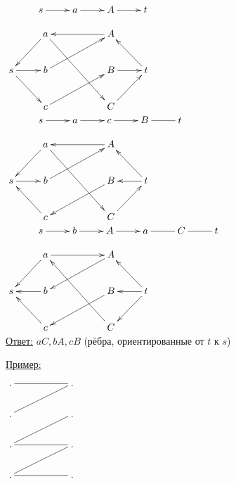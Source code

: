 \documentclass[a4paper, 12pt] {article}
\begin{document}
$\begin{matrix}
	\xymatrix{
		& s  \ar@{->}[r] & a \ar@{->}[r] & A \ar@{->}[r] & t \\
	}
\end{matrix}$

$\xymatrix{
	& 	a \ar@{<-}[rr] \ar@{->}[rrdd]  & & A \\
	s \ar@{->}[r] \ar@{->}[rd] \ar@{<-}[ru] &	b \ar@{->}[rru]    & & B & t \ar@{<-}[l] \ar@{<-}[ld] \ar@{->}[lu] \\
	&	c \ar@{->}[rru]   & & C \\
}$\\

$\begin{matrix}
	\xymatrix{
		& s  \ar@{->}[r] & a \ar@{->}[r] & c \ar@{->}[r] & B \ar@{-}[r] & t \\
	}
\end{matrix}$

$\xymatrix{
	& 	a \ar@{<-}[rr] \ar@{->}[rrdd]  & & A \\
	s \ar@{->}[r] \ar@{<-}[rd] \ar@{<-}[ru] &	b \ar@{->}[rru]    & & B & t \ar@{->}[l] \ar@{<-}[ld] \ar@{->}[lu] \\
	&	c \ar@{<-}[rru]   & & C \\
}$\\

$\begin{matrix}
	\xymatrix{
		& s  \ar@{->}[r] & b \ar@{->}[r] & A \ar@{->}[r] & a \ar@{-}[r] & C \ar@{-}[r] & t \\
	}
\end{matrix}$

$\xymatrix{
	& 	a \ar@{->}[rr] \ar@{<-}[rrdd]  & & A \\
	s \ar@{<-}[r] \ar@{<-}[rd] \ar@{<-}[ru] &	b \ar@{<-}[rru]    & & B & t \ar@{->}[l] \ar@{->}[ld] \ar@{->}[lu] \\
	&	c \ar@{<-}[rru]   & & C \\
}$\\

\underline{Ответ:} $ aC, bA, cB $ (рёбра, ориентированные от $ t $ к $ s $)

\newpage

\underline{Пример:}

$\xymatrix{
	.  \ar@{-}[rr]  & & . \\
	.  \ar@{-}[rru]  & & . \\
	.  \ar@{-}[rr] \ar@{-}[rru]  & &  . \\
	.  \ar@{-}[rr] \ar@{-}[rru]  & &  . \\
}$\\
\end{document}
